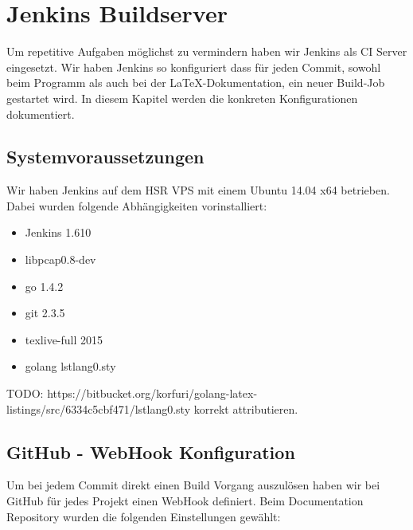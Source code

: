 \chapter{Jenkins Buildserver}
Um repetitive Aufgaben möglichst zu vermindern haben wir Jenkins als \acs{CI} Server eingesetzt. Wir haben Jenkins so konfiguriert dass für jeden Commit, sowohl beim Programm als auch bei der LaTeX-Dokumentation, ein neuer Build-Job gestartet wird.
In diesem Kapitel werden die konkreten Konfigurationen dokumentiert.

\section{Systemvoraussetzungen}
Wir haben Jenkins auf dem HSR VPS mit einem Ubuntu 14.04 x64 betrieben. Dabei wurden folgende Abhängigkeiten vorinstalliert:

\begin{itemize}
  \item Jenkins 1.610
  \item libpcap0.8-dev
  \item go 1.4.2
  \item git 2.3.5
  \item texlive-full 2015
  \item golang lstlang0.sty
\end{itemize}

TODO: https://bitbucket.org/korfuri/golang-latex-listings/src/6334c5cbf471/lstlang0.sty
korrekt attributieren.

\section{GitHub - WebHook Konfiguration}
Um bei jedem Commit direkt einen Build Vorgang auszulösen haben wir bei GitHub für jedes Projekt einen WebHook definiert. Beim Documentation Repository wurden die folgenden Einstellungen gewählt:

